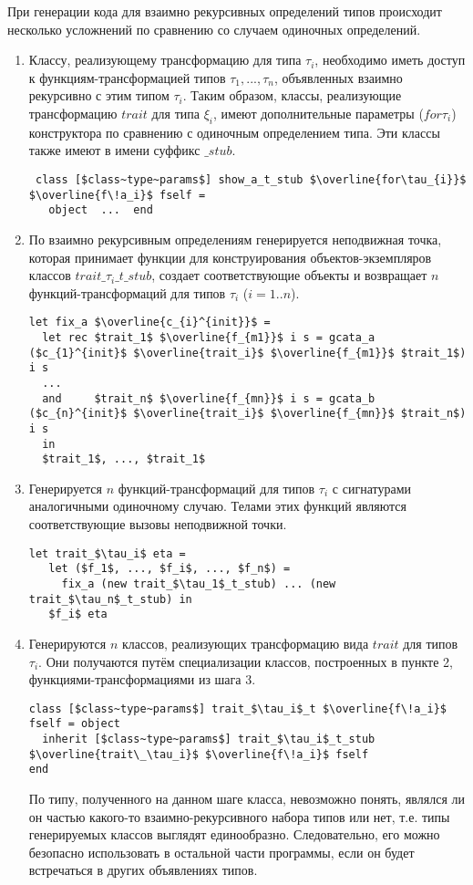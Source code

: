 \documentclass[acmsmall,review,anonymous]{acmart}\settopmatter{printfolios=true,printccs=false,printacmref=false}
\begin{document}
При генерации кода для взаимно рекурсивных определений типов происходит несколько усложнений по сравнению со случаем одиночных определений.

\begin{enumerate}
 \item Классу, реализующему трансформацию для типа $\tau_i$, необходимо иметь доступ к функциям-трансформацией типов $\tau_1,...,\tau_n$, объявленных взаимно рекурсивно с этим типом $\tau_i$. Таким образом, классы, реализующие трансформацию $trait$ для типа $\xi_i$, имеют дополнительные параметры ($f\!or\tau_{i}$) конструктора по сравнению с одиночным определением типа. Эти классы также имеют в имени суффикс $\_stub$.
 \begin{lstlisting}
 class [$class~type~params$] show_a_t_stub $\overline{for\tau_{i}}$ $\overline{f\!a_i}$ fself = 
   object  ...  end
\end{lstlisting}

 \item По взаимно рекурсивным определениям генерируется неподвижная точка, которая принимает функции для конструирования объектов-экземпляров классов $trait\_\tau_i\_t\_stub$, создает соответствующие объекты и возвращает $n$ функций-трансформаций для типов $\tau_i$ ($i=1..n$).

\begin{lstlisting}
let fix_a $\overline{c_{i}^{init}}$ =
  let rec $trait_1$ $\overline{f_{m1}}$ i s = gcata_a ($c_{1}^{init}$ $\overline{trait_i}$ $\overline{f_{m1}}$ $trait_1$) i s
  ...
  and     $trait_n$ $\overline{f_{mn}}$ i s = gcata_b ($c_{n}^{init}$ $\overline{trait_i}$ $\overline{f_{mn}}$ $trait_n$) i s 
  in
  $trait_1$, ..., $trait_1$
\end{lstlisting}
 
 \item Генерируется $n$ функций-трансформаций для типов $\tau_i$ с сигнатурами аналогичными одиночному случаю. Телами этих функций являются соответствующие вызовы неподвижной точки.
\begin{lstlisting}
let trait_$\tau_i$ eta = 
   let ($f_1$, ..., $f_i$, ..., $f_n$) = 
     fix_a (new trait_$\tau_1$_t_stub) ... (new trait_$\tau_n$_t_stub) in
   $f_i$ eta
\end{lstlisting} 

 \item Генерируются $n$ классов, реализующих трансформацию вида $trait$ для типов $\tau_i$. Они получаются путём специализации 
 классов, построенных в пункте 2, функциями-трансформациями из шага 3.
 \begin{lstlisting}
class [$class~type~params$] trait_$\tau_i$_t $\overline{f\!a_i}$ fself = object 
  inherit [$class~type~params$] trait_$\tau_i$_t_stub $\overline{trait\_\tau_i}$ $\overline{f\!a_i}$ fself
end
\end{lstlisting} 
По типу, полученного на данном шаге класса, невозможно понять, являлся ли он частью какого-то взаимно-рекурсивного набора типов или
нет, т.е. типы генерируемых классов выглядят единообразно. Следовательно, его можно безопасно использовать в остальной части программы, если он будет встречаться в других объявлениях типов.
\end{enumerate}
\end{document}
